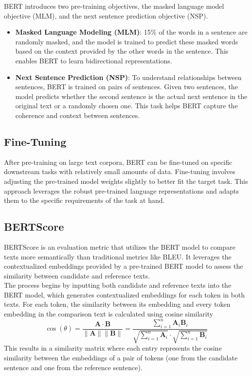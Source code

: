 BERT introduces two pre-training objectives, the masked language model objective (MLM), and the next sentence prediction objective (NSP).


\begin{itemize}
    \item \textbf{Masked Language Modeling (MLM)}:
          15\% of the words in a sentence are randomly masked, and the model is trained to predict these masked words based on the context provided by the other words in the sentence. This enables BERT to learn bidirectional representations.

    \item \textbf{Next Sentence Prediction (NSP)}:
          To understand relationships between sentences, BERT is trained on pairs of sentences. Given two sentences, the model predicts whether the second sentence is the actual next sentence in the original text or a randomly chosen one. This task helps BERT capture the coherence and context between sentences.
\end{itemize}


\subsection{Fine-Tuning}
After pre-training on large text corpora, BERT can be fine-tuned on specific downstream tasks with relatively small amounts of data. Fine-tuning involves adjusting the pre-trained model weights slightly to better fit the target task. This approach leverages the robust pre-trained language representations and adapts them to the specific requirements of the task at hand.




\subsection{BERTScore}
BERTScore is an evaluation metric that utilizes the BERT model to compare texts more semantically than traditional metrics like BLEU. It leverages the contextualized embeddings provided by a pre-trained BERT model to assess the similarity between candidate and reference texts.\\

The process begins by inputting both candidate and reference texts into the BERT model, which generates contextualized embeddings for each token in both texts. For each token, the similarity between its embedding and every token embedding in the comparison text is calculated using cosine similarity
\begin{equation}
    \cos(\theta) = \frac{\mathbf{A} \cdot \mathbf{B}}{\|\mathbf{A}\| \|\mathbf{B}\|} = \frac{\sum_{i=1}^{n} \mathbf{A}_{i} \mathbf{B}_{i} }{\sqrt{\sum_{i=1}^{n} \mathbf{A}_{i}} \cdot \sqrt{\sum_{i=1}^{n} \mathbf{B}_{i}} }
\end{equation}
This results in a similarity matrix where each entry represents the cosine similarity between the embeddings of a pair of tokens (one from the candidate sentence and one from the reference sentence).\\


